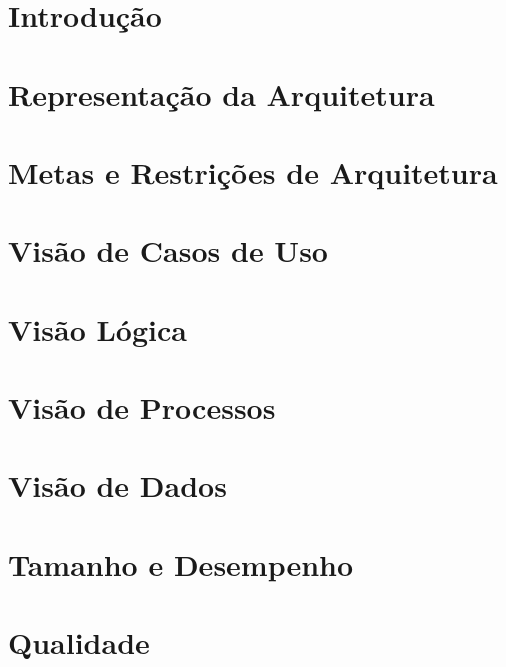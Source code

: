 \section{Introdução} %
\label{sec:introdu_o}
 

\section{Representação da Arquitetura} %
\label{sec:representacao_da_arquitetura}


\section{Metas e Restrições de Arquitetura} %
\label{sec:metas_e_restricoes_de_arquitetura}
 

\section{Visão de Casos de Uso} %
\label{sec:visao_de_casos_de_uso}
 

\section{Visão Lógica} %
\label{sec:visao_logica}
 

\section{Visão de Processos} %
\label{sec:visao_de_processos}
 

\section{Visão de Dados} %
\label{sec:visao_de_dados}
 

\section{Tamanho e Desempenho} %
\label{sec:tamanho_e_desempenho}
 

\section{Qualidade} %
\label{sec:qualidade}
 
